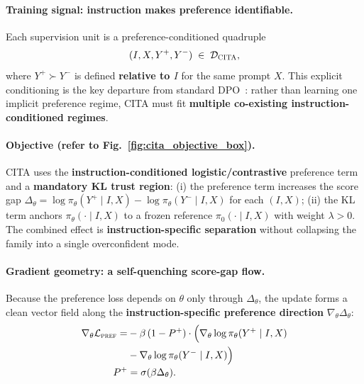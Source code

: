\vspace{-0.35em}
\paragraph{Training signal: instruction makes preference identifiable.}
Each supervision unit is a preference-conditioned quadruple
\vspace{-1mm}
\[
(I, X, Y^{+}, Y^{-}) \;\in\; \mathcal{D}_{\textsc{CITA}},
\]
\vspace{-1mm}
where $Y^+\succ Y^-$ is defined \textbf{relative to $I$} for the same prompt $X$.
This explicit conditioning is the key departure from standard DPO~\cite{rafailov2023direct}: rather than learning one implicit preference regime, CITA must fit \textbf{multiple co-existing instruction-conditioned regimes}.

\vspace{-0.5em}
\paragraph{Objective (refer to Fig.~\ref{fig:cita_objective_box}).}
CITA uses the \textbf{instruction-conditioned logistic/contrastive} preference term and a \textbf{mandatory KL trust region}:
(i) the preference term increases the score gap $\Delta_\theta=\log\pi_\theta(Y^+\!\mid I,X)-\log\pi_\theta(Y^-\!\mid I,X)$ for each $(I,X)$;
(ii) the KL term anchors $\pi_\theta(\cdot\mid I,X)$ to a frozen reference $\pi_0(\cdot\mid I,X)$ with weight $\lambda>0$.
The combined effect is \textbf{instruction-specific separation} without collapsing the family into a single overconfident mode.

\vspace{-0.35em}
\paragraph{Gradient geometry: a self-quenching score-gap flow.}
Because the preference loss depends on $\theta$ only through $\Delta_\theta$, the update forms a clean vector field along the
\textbf{instruction-specific preference direction} $\nabla_\theta \Delta_\theta$:
\[
\begin{aligned}
\nabla_{\theta}\mathcal{L}_{\textsc{pref}}
=&
-\beta\,(1-P^{+})\cdot\Big(\nabla_{\theta}\log \pi_{\theta}(Y^{+}\mid I,X)\\
&-\nabla_{\theta}\log \pi_{\theta}(Y^{-}\mid I,X)
\Big)
\\[-0.15em]
P^{+}&=\sigma(\beta\Delta_\theta).
\end{aligned}
\]







